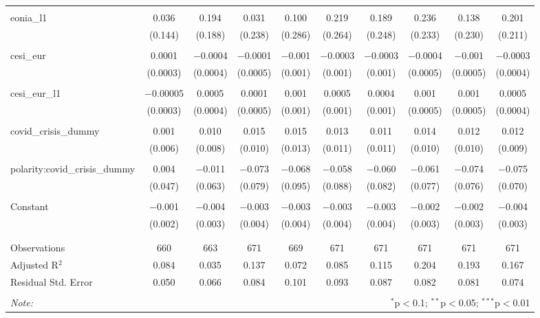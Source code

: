 \begin{table}[!htbp]
\begin{adjustbox}{width=1.25\textwidth}
\begin{tabular}{@{\extracolsep{5pt}}lccccccccc}
  & & & & & & & & & \\ 
 eonia\_l1 & 0.036 & 0.194 & 0.031 & 0.100 & 0.219 & 0.189 & 0.236 & 0.138 & 0.201 \\ 
  & (0.144) & (0.188) & (0.238) & (0.286) & (0.264) & (0.248) & (0.233) & (0.230) & (0.211) \\ 
  & & & & & & & & & \\ 
 cesi\_eur & 0.0001 & $-$0.0004 & $-$0.0001 & $-$0.001 & $-$0.0003 & $-$0.0003 & $-$0.0004 & $-$0.001 & $-$0.0003 \\ 
  & (0.0003) & (0.0004) & (0.0005) & (0.001) & (0.001) & (0.001) & (0.0005) & (0.0005) & (0.0004) \\ 
  & & & & & & & & & \\ 
 cesi\_eur\_l1 & $-$0.00005 & 0.0005 & 0.0001 & 0.001 & 0.0005 & 0.0004 & 0.001 & 0.001 & 0.0005 \\ 
  & (0.0003) & (0.0004) & (0.0005) & (0.001) & (0.001) & (0.001) & (0.0005) & (0.0005) & (0.0004) \\ 
  & & & & & & & & & \\ 
 covid\_crisis\_dummy & 0.001 & 0.010 & 0.015 & 0.015 & 0.013 & 0.011 & 0.014 & 0.012 & 0.012 \\ 
  & (0.006) & (0.008) & (0.010) & (0.013) & (0.011) & (0.011) & (0.010) & (0.010) & (0.009) \\ 
  & & & & & & & & & \\ 
 polarity:covid\_crisis\_dummy & 0.004 & $-$0.011 & $-$0.073 & $-$0.068 & $-$0.058 & $-$0.060 & $-$0.061 & $-$0.074 & $-$0.075 \\ 
  & (0.047) & (0.063) & (0.079) & (0.095) & (0.088) & (0.082) & (0.077) & (0.076) & (0.070) \\ 
  & & & & & & & & & \\ 
 Constant & $-$0.001 & $-$0.004 & $-$0.003 & $-$0.003 & $-$0.003 & $-$0.003 & $-$0.002 & $-$0.002 & $-$0.004 \\ 
  & (0.002) & (0.003) & (0.004) & (0.004) & (0.004) & (0.004) & (0.003) & (0.003) & (0.003) \\ 
  & & & & & & & & & \\ 
\hline \\[-1.8ex] 
Observations & 660 & 663 & 671 & 669 & 671 & 671 & 671 & 671 & 671 \\ 
Adjusted R$^{2}$ & 0.084 & 0.035 & 0.137 & 0.072 & 0.085 & 0.115 & 0.204 & 0.193 & 0.167 \\ 
Residual Std. Error & 0.050 & 0.066 & 0.084 & 0.101 & 0.093 & 0.087 & 0.082 & 0.081 & 0.074 \\ 
\hline 
\hline \\[-1.8ex] 
\textit{Note:}  & \multicolumn{9}{r}{$^{*}$p$<$0.1; $^{**}$p$<$0.05; $^{***}$p$<$0.01} \\ 
\end{tabular} 
\end{adjustbox} 
\end{table} 
